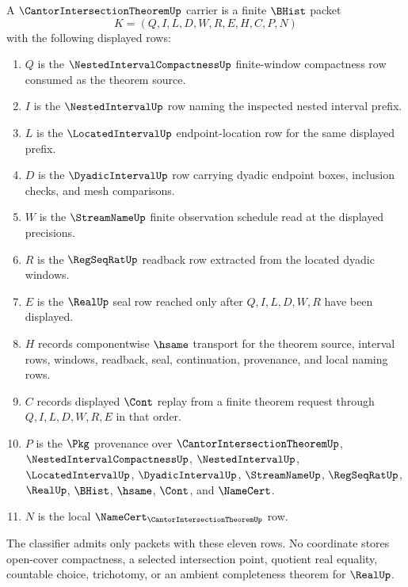 \begin{definition}
\label{def:cantor-intersection-theorem-carrier}
A $\CantorIntersectionTheoremUp$ carrier is a finite $\BHist$ packet
$$
K=(Q,I,L,D,W,R,E,H,C,P,N)
$$
with the following displayed rows:
\begin{enumerate}
\item $Q$ is the $\NestedIntervalCompactnessUp$ finite-window compactness row consumed as the theorem source.
\item $I$ is the $\NestedIntervalUp$ row naming the inspected nested interval prefix.
\item $L$ is the $\LocatedIntervalUp$ endpoint-location row for the same displayed prefix.
\item $D$ is the $\DyadicIntervalUp$ row carrying dyadic endpoint boxes, inclusion checks, and mesh comparisons.
\item $W$ is the $\StreamNameUp$ finite observation schedule read at the displayed precisions.
\item $R$ is the $\RegSeqRatUp$ readback row extracted from the located dyadic windows.
\item $E$ is the $\RealUp$ seal row reached only after $Q,I,L,D,W,R$ have been displayed.
\item $H$ records componentwise $\hsame$ transport for the theorem source, interval rows, windows, readback, seal, continuation, provenance, and local naming rows.
\item $C$ records displayed $\Cont$ replay from a finite theorem request through $Q,I,L,D,W,R,E$ in that order.
\item $P$ is the $\Pkg$ provenance over $\CantorIntersectionTheoremUp$, $\NestedIntervalCompactnessUp$, $\NestedIntervalUp$, $\LocatedIntervalUp$, $\DyadicIntervalUp$, $\StreamNameUp$, $\RegSeqRatUp$, $\RealUp$, $\BHist$, $\hsame$, $\Cont$, and $\NameCert$.
\item $N$ is the local $\NameCert_{\CantorIntersectionTheoremUp}$ row.
\end{enumerate}
The classifier admits only packets with these eleven rows. No coordinate stores open-cover compactness, a selected intersection point, quotient real equality, countable choice, trichotomy, or an ambient completeness theorem for $\RealUp$.
\end{definition}

